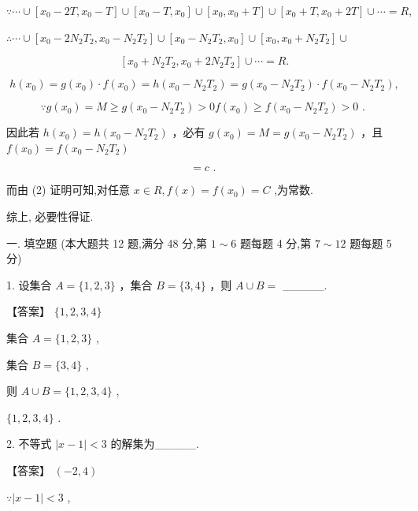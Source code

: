 \documentclass[10pt]{article}
\begin{document}
\(\because \cdots  \cup  \left\lbrack  {{x}_{0} - {2T},{x}_{0} - T}\right\rbrack   \cup  \left\lbrack  {{x}_{0} - T,{x}_{0}}\right\rbrack   \cup  \left\lbrack  {{x}_{0},{x}_{0} + T}\right\rbrack   \cup  \left\lbrack  {{x}_{0} + T,{x}_{0} + {2T}}\right\rbrack   \cup  \cdots  = R,\)

\(\therefore \cdots  \cup  \left\lbrack  {{x}_{0} - 2{N}_{2}{T}_{2},{x}_{0} - {N}_{2}{T}_{2}}\right\rbrack   \cup  \left\lbrack  {{x}_{0} - {N}_{2}{T}_{2},{x}_{0}}\right\rbrack   \cup  \left\lbrack  {{x}_{0},{x}_{0} + {N}_{2}{T}_{2}}\right\rbrack   \cup\)

\[
\left\lbrack  {{x}_{0} + {N}_{2}{T}_{2},{x}_{0} + 2{N}_{2}{T}_{2}}\right\rbrack   \cup  \cdots  = R.
\]

\[
h\left( {x}_{0}\right)  = g\left( {x}_{0}\right)  \cdot  f\left( {x}_{0}\right)  = h\left( {{x}_{0} - {N}_{2}{T}_{2}}\right)  = g\left( {{x}_{0} - {N}_{2}{T}_{2}}\right)  \cdot  f\left( {{x}_{0} - {N}_{2}{T}_{2}}\right) ,
\]

\[
\because g\left( {x}_{0}\right)  = M \geq  g\left( {{x}_{0} - {N}_{2}{T}_{2}}\right)  > {0f}\left( {x}_{0}\right)  \geq  f\left( {{x}_{0} - {N}_{2}{T}_{2}}\right)  > 0\text{ . }
\]

因此若 \(h\left( {x}_{0}\right)  = h\left( {{x}_{0} - {N}_{2}{T}_{2}}\right)\) ，必有 \(g\left( {x}_{0}\right)  = M = g\left( {{x}_{0} - {N}_{2}{T}_{2}}\right)\) ，且 \(f\left( {x}_{0}\right)  = f\left( {{x}_{0} - {N}_{2}{T}_{2}}\right)\)

\[
= c\text{ . }
\]

而由 (2) 证明可知,对任意 \(x \in  R,f\left( x\right)  = f\left( {x}_{0}\right)  = C\) ,为常数.

综上, 必要性得证.

一. 填空题 (本大题共 12 题,满分 48 分,第 \(1 \sim  6\) 题每题 4 分,第 \(7 \sim  {12}\) 题每题 5 分)

1. 设集合 \(A = \{ 1,2,3\}\) ，集合 \(B = \{ 3,4\}\) ，则 \(A \cup  B =\) \_\_\_\_\_.

【答案】 \(\{ 1,2,3,4\}\)

集合 \(A = \{ 1,2,3\}\) ,

集合 \(B = \{ 3,4\}\) ,

则 \(A \cup  B = \{ 1,2,3,4\}\) ,

\(\{ 1,2,3,4\}\) .

2. 不等式 \(\left| {x - 1}\right|  < 3\) 的解集为\_\_\_\_\_.

【答案】 \(\left( {-2,4}\right)\)

\(\because \left| {x - 1}\right|  < 3\) ,
\end{document}
